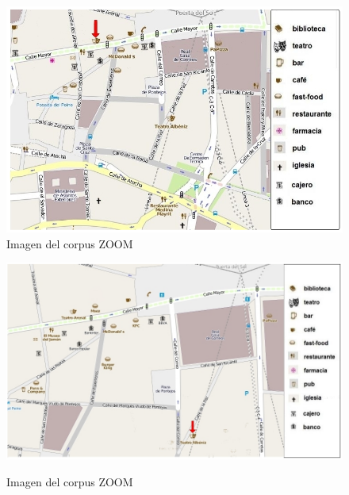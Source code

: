 \begin{figure}
\begin{minipage}[ht]{0.5\linewidth}
\centering
\includegraphics[width=\textwidth]{images/corpus/mapa1.png}\\[0pt]
\caption{Imagen del corpus ZOOM}
\label{mapa1}
\end{minipage}
\hspace*{0cm}
\begin{minipage}[ht]{0.5\linewidth}
\centering
\includegraphics[width=\textwidth]{images/corpus/mapa2.png}\\[0pt]
\caption{Imagen del corpus ZOOM}
\label{mapa2}
\end{minipage}
\end{figure}


